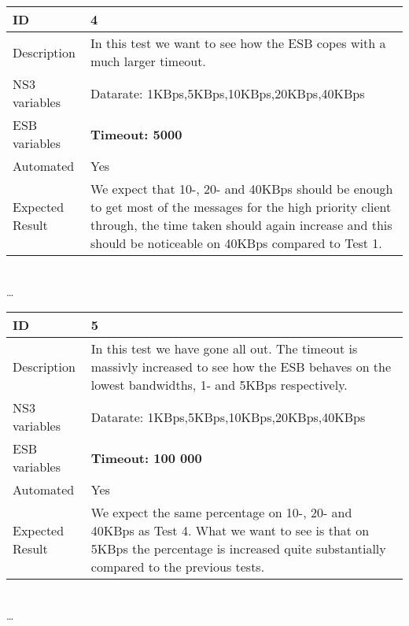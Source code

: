 \begin{center}
\begin{tabular}{| p{4cm} | p{8cm} |}%
    \hline
    ID & 4 \\
    \hline
    Description & In this test we want to see how the ESB copes with a much larger timeout.  \\
    \hline
    NS3 variables & Datarate: 1KBps,5KBps,10KBps,20KBps,40KBps \\
    \hline
    ESB variables & \textbf{Timeout: 5000} \\
    \hline
    Automated & Yes \\
    \hline
    Expected Result & We expect that 10-, 20- and 40KBps should be enough to get most of the messages for the high priority client through, the time taken should again increase and this should be noticeable on 40KBps compared to Test 1.  \\
    \hline
    \end{tabular}
    \\ \ldots \\
    \begin{tabular}{| p{4cm} | p{8cm} |}%
    \hline
    ID & 5 \\
    \hline
    Description & In this test we have gone all out. The timeout is massivly increased to see how the ESB behaves on the lowest bandwidths, 1- and 5KBps respectively.  \\
    \hline
    NS3 variables & Datarate: 1KBps,5KBps,10KBps,20KBps,40KBps \\
    \hline
    ESB variables & \textbf{Timeout: 100 000} \\
    \hline
    Automated & Yes \\
    \hline
    Expected Result & We expect the same percentage on 10-, 20- and 40KBps as Test 4. What we want to see is that on 5KBps the percentage is increased quite substantially compared to the previous tests. \\
    \hline
\end{tabular}

\\ \ldots \\

\end{center}
